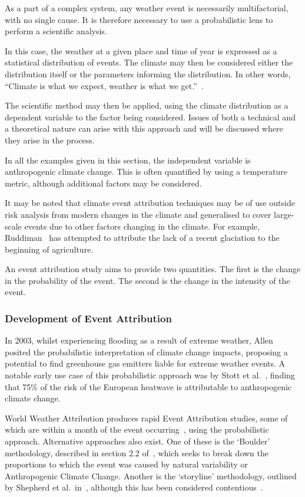 As a part of a complex system,
    any weather event is necessarily multifactorial,
    with no single cause.
It is therefore necessary to use a probabilistic lens to perform a scientific analysis.

In this case, the weather at a given place and time of year is expressed as a statistical distribution of events.
The climate may then be considered either the distribution itself
    or the parameters informing the distribution.
In other words, ``Climate is what we expect, weather is what we get.''~\cite{Herbertson_1935}.

The scientific method may then be applied,
    using the climate distribution as a dependent variable to the factor being considered.
Issues of both a technical and a theoretical nature can arise with this approach
    and will be discussed where they arise in the process.

In all the examples given in this section,
    the independent variable is anthropogenic climate change.
This is often quantified by using a temperature metric,
    although additional factors may be considered.

It may be noted that
    climate event attribution techniques may be of use outside risk analysis from modern changes in the climate
    and generalised to cover large-scale events due to other factors changing in the climate.
For example,
    Ruddiman~\cite{Ruddiman_2010} has attempted to attribute the lack of a recent glaciation to the beginning of agriculture.

An event attribution study aims to provide two quantities.
The first is the change in the probability of the event.
The second is the change in the intensity of the event.

\subsubsection{Development of Event Attribution}

In 2003, whilst experiencing flooding as a result of extreme weather,
    Allen~\cite{Allen_2003} posited the probabilistic interpretation of climate change impacts,
    proposing a potential to find greenhouse gas emitters liable for extreme weather events.
A notable early use case of this probabilistic approach was by Stott et al.~\cite{Stott_2004},
    finding that 75\% of the risk of the European heatwave is attributable to anthropogenic climate change.

World Weather Attribution produces rapid Event Attribution studies,
    some of which are within a month of the event occurring~\cite{van_Oldenborgh_et_al_2018},
    using the probabilistic approach.
Alternative approaches also exist.
One of these is the `Boulder' methodology,
    described in section 2.2 of~\cite{Otto_2017},
    which seeks to break down the proportions to which the event was caused by natural variability or Anthropogenic Climate Change.
Another is the `storyline' methodology,
    outlined by Shepherd et al.\ in~\cite{Shepherd_et_al_2018},
    although this has been considered contentious~\cite{García-Portela_Maraun_2023}.

